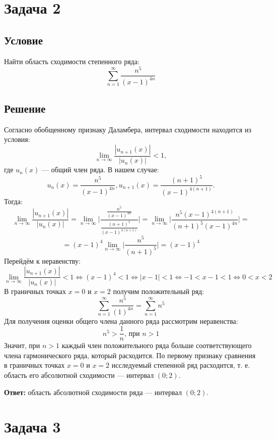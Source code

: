 \documentclass[12pt]{article}
\begin{document}
	\newpage

	\section*{Задача 2}	
	\subsection*{Условие}
	
	Найти область сходимости степенного ряда:
	$$ \sum_{n=1}^{\infty} \frac{n^5}{(x-1)^{4n}} $$

	\subsection*{Решение}

	Согласно обобщенному признаку Даламбера, интервал сходимости находится из условия:
	$$ \lim_{n \to \infty} \frac{|u_{n+1}(x)|}{|u_{n}(x)|} < 1 ,$$
	где $ u_{n}(x) $ --- общий член ряда. В нашем случае:
	$$ u_{n}(x) = \frac{n^5}{(x-1)^{4n}},  u_{n+1}(x) = \frac{(n+1)^5}{(x-1)^{4(n+1)}}.$$	
	Тогда: 
	$$ \lim_{n \to \infty} \frac{|u_{n+1}(x)|}{|u_{n}(x)|} = \lim_{n \to \infty} \Big| \frac{\frac{n^5}{(x-1)^{4n}}}{\frac{(n+1)^5}{(x-1)^{4(n+1)}}} \Big| = \lim_{n \to \infty} \Big| \frac{n^5(x-1)^{4(n+1)}}{(n+1)^5 (x-1)^{4n}} \Big| = $$
	$$ = (x - 1)^4 \lim_{n \to \infty} \Big| \frac{n^5 }{(n+1)^5} \Big| = (x - 1)^4 $$
	Перейдём к неравенству:
	$$ \lim_{n \to \infty} \frac{|u_{n+1}(x)|}{|u_{n}(x)|} < 1 \Leftrightarrow (x - 1)^4 < 1 \Leftrightarrow |x - 1| < 1 \Leftrightarrow - 1 < x - 1 < 1 \Leftrightarrow 0 < x < 2  $$
	В граничных точках $ x = 0 $ и $ x = 2 $  получим положительный ряд:
	$$ \sum_{n=1}^{\infty} \frac{n^5}{(1)^{4n}} = \sum_{n=1}^{\infty} n^5 $$
	Для получения оценки общего члена данного ряда рассмотрим неравенства:
	$$ n^5 > \frac{1}{n} \text{, при } n > 1 $$
	Значит, при $ n > 1 $ каждый член положительного ряда больше соответствующего члена гармонического ряда, который расходится. По первому признаку сравнения в граничных точках $ x = 0 $ и $ x = 2 $ исследуемый степенной ряд расходится, т. е. область его абсолютной сходимости --- интервал $ (0;2) $.

	\hspace{150pt}\textbf{Ответ:} область абсолютной сходимости ряда --- интервал $ (0;2) $.

	\newpage

	\section*{Задача 3}	
\end{document}
